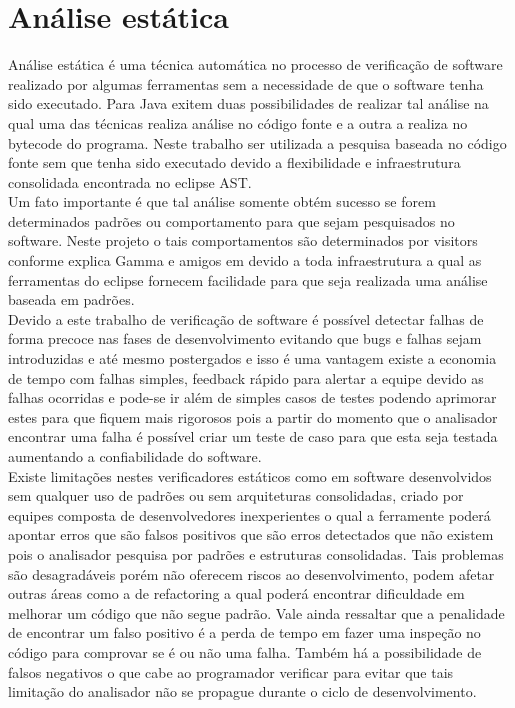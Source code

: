 \chapter{Análise estática}

Análise estática é uma técnica automática no processo de verificação de software realizado por algumas ferramentas sem a necessidade de que o software tenha sido executado. Para Java exitem duas possibilidades de realizar tal análise na qual uma das técnicas realiza análise no código fonte e a outra a realiza no bytecode do programa. Neste trabalho ser utilizada a pesquisa baseada no código fonte sem que tenha sido executado devido a flexibilidade e infraestrutura consolidada encontrada no eclipse AST.\\

Um fato importante é que tal análise somente obtém sucesso se forem determinados padrões ou comportamento para que sejam pesquisados no software. Neste projeto o tais comportamentos são determinados por visitors conforme explica Gamma e amigos em\cite{Gamma:1995:DPE:186897} devido a toda infraestrutura a qual as ferramentas do eclipse fornecem facilidade para que seja realizada uma análise baseada em padrões.\\

Devido a este trabalho de verificação de software é possível detectar falhas de forma precoce nas fases de  desenvolvimento evitando que bugs e falhas sejam introduzidas e até mesmo postergados e isso é uma vantagem existe a economia de tempo com falhas simples, feedback rápido para alertar a equipe devido as falhas ocorridas e pode-se ir além de simples casos de testes podendo aprimorar estes para que  fiquem mais rigorosos pois a partir do momento que o analisador encontrar uma falha é possível criar um teste de caso para que esta seja testada aumentando a confiabilidade do software.\\

Existe limitações nestes verificadores estáticos como em software desenvolvidos sem qualquer uso de padrões ou sem arquiteturas consolidadas, criado por equipes composta de desenvolvedores inexperientes o qual a ferramente poderá apontar erros que são falsos positivos que são erros detectados que não existem pois o analisador pesquisa por padrões e estruturas consolidadas. Tais problemas são desagradáveis porém não oferecem riscos ao desenvolvimento, podem afetar outras áreas como a de refactoring a qual poderá encontrar dificuldade em melhorar um código que não segue padrão. Vale ainda ressaltar que a penalidade de encontrar um falso positivo é a perda de tempo em fazer uma inspeção no código para comprovar se é ou não uma falha. Também há a possibilidade de falsos negativos o que cabe ao programador verificar para evitar que tais limitação do analisador não se propague durante o ciclo de desenvolvimento.\\